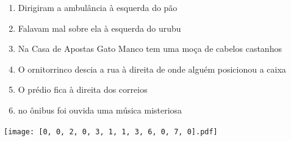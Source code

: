 \documentclass[12pt]{article}
\begin{document}
		 

\pagebreak


	\begin{enumerate}
		  \sffamily %
		  \large %


\vfill \item
Dirigiram a ambulância	%
à esquerda
do pão	%

\vfill \item
Falavam mal sobre ela	%
à esquerda
do urubu	%

\vfill \item
Na Casa de Apostas Gato Manco	%
tem uma moça de cabelos castanhos	%

\vfill \item
O ornitorrinco descia a rua	%
à direita
de onde alguém posicionou a caixa	%

\vfill \item
O prédio fica	%
à direita
dos correios	%

\vfill \item
no ônibus	%
foi ouvida uma música misteriosa	%
	\end{enumerate}
		  
		  \hfill

		  \vfill

\texttt{[image: [0, 0, 2, 0, 3, 1, 1, 3, 6, 0, 7, 0].pdf]}


	\hfill	  	  


\pagebreak			
\end{document}
